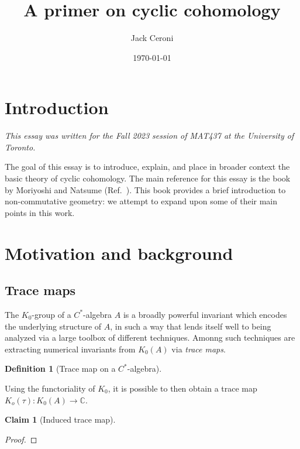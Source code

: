 \documentclass[aps,pra,showpacs,notitlepage,onecolumn,superscriptaddress,nofootinbib]{revtex4-1}
\newcommand{\hhrulefill}{\hspace{-1.0em}\hrulefill}
\theoremstyle{definition}
\newtheorem{definition}{Definition}[section]
\newtheorem{claim}{Claim}[section]
\begin{document}
\title{A primer on cyclic cohomology}
\author{Jack Ceroni}

\date{\today}

\maketitle

\section{Introduction}

\noindent \emph{This essay was written for the Fall 2023 session of MAT437 at the University of Toronto.}
\newline

\noindent The goal of this essay is to introduce, explain, and place in broader context the basic theory of cyclic cohomology. The main reference
for this essay is the book by Moriyoshi and Natsume (Ref.~\cite{}). This book provides a brief introduction to non-commutative geometry: we attempt
to expand upon some of their main points in this work.

\hhrulefill

\section{Motivation and background}

\subsection{Trace maps}

\noindent The $K_0$-group of a $C^{*}$-algebra $A$ is a broadly powerful invariant which encodes the underlying structure of $A$, in such a way that lends
itself well to being analyzed via a large toolbox of different techniques. Amonng such techniques are extracting numerical invariants from $K_0(A)$ via \emph{trace maps}.

\begin{definition}[Trace map on a $C^{*}$-algebra]
\end{definition}

\noindent Using the functoriality of $K_0$, it is possible to then obtain a trace map $K_o(\tau) : K_0(A) \rightarrow \mathbb{C}$.

\begin{claim}[Induced trace map]
\end{claim}
\begin{proof}
  \end{proof}
\end{document}

